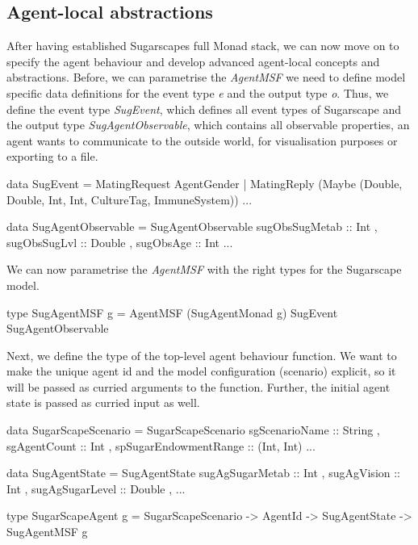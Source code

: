 \subsection{Agent-local abstractions}
After having established Sugarscapes full Monad stack, we can now move on to specify the agent behaviour and develop advanced agent-local concepts and abstractions. Before, we can parametrise the \textit{AgentMSF} we need to define model specific data definitions for the event type \textit{e} and the output type \textit{o}. Thus, we define the event type \textit{SugEvent}, which defines all event types of Sugarscape and the output type \textit{SugAgentObservable}, which contains all observable properties, an agent wants to communicate to the outside world, for visualisation purposes or exporting to a file. 

\begin{HaskellCode}
data SugEvent = MatingRequest AgentGender
              | MatingReply 
                 (Maybe (Double, Double, Int, Int, CultureTag, ImmuneSystem))
              ...

data SugAgentObservable = SugAgentObservable
  { sugObsSugMetab :: Int
  , sugObsSugLvl   :: Double
  , sugObsAge      :: Int
  ...  
  }
\end{HaskellCode}

We can now parametrise the \textit{AgentMSF} with the right types for the Sugarscape model.

\begin{HaskellCode}
type SugAgentMSF g = AgentMSF (SugAgentMonad g) SugEvent SugAgentObservable
\end{HaskellCode}

Next, we define the type of the top-level agent behaviour function. We want to make the unique agent id and the model configuration (scenario) explicit, so it will be passed as curried arguments to the function. Further, the initial agent state is passed as curried input as well.

\begin{HaskellCode}
data SugarScapeScenario = SugarScapeScenario 
  { sgScenarioName        :: String
  , sgAgentCount          :: Int
  , spSugarEndowmentRange :: (Int, Int)
  ...
  }

data SugAgentState = SugAgentState
  { sugAgSugarMetab :: Int
  , sugAgVision     :: Int
  , sugAgSugarLevel :: Double
  , ...
  }
  
type SugarScapeAgent g 
  = SugarScapeScenario -> AgentId -> SugAgentState -> SugAgentMSF g
\end{HaskellCode}

